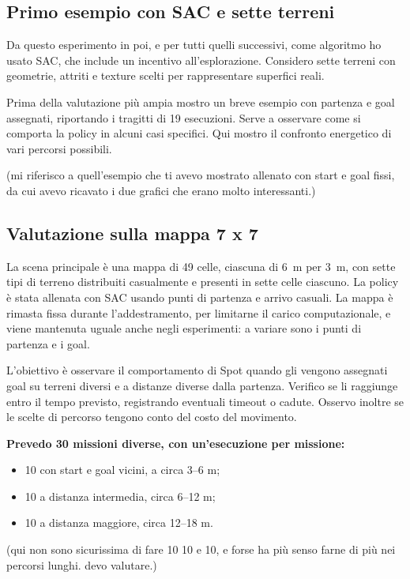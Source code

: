\documentclass[11pt,a4paper]{article}
\begin{document}
\subsection{Primo esempio con SAC e sette terreni}

Da questo esperimento in poi, e per tutti quelli successivi, come algoritmo ho usato SAC, che include un incentivo all'esplorazione.
Considero sette terreni con geometrie, attriti e texture scelti per rappresentare superfici reali.

Prima della valutazione più ampia mostro un breve esempio con partenza e goal assegnati, riportando i tragitti di 19 esecuzioni.
Serve a osservare come si comporta la policy in alcuni casi specifici.
Qui mostro il confronto energetico di vari percorsi possibili.

(mi riferisco a quell'esempio che ti avevo mostrato allenato con start e goal fissi, da cui avevo ricavato i due grafici che erano molto interessanti.)


\subsection{Valutazione sulla mappa 7 x 7}

La scena principale è una mappa di 49 celle, ciascuna di 6~m per 3~m, con sette tipi di terreno distribuiti casualmente e presenti in sette celle ciascuno.
La policy è stata allenata con SAC usando punti di partenza e arrivo casuali. La mappa è rimasta fissa durante l'addestramento, per limitarne il carico computazionale, e viene mantenuta uguale anche negli esperimenti: a variare sono i punti di partenza e i goal.

L'obiettivo è osservare il comportamento di Spot quando gli vengono assegnati goal su terreni diversi e a distanze diverse dalla partenza. Verifico se li raggiunge entro il tempo previsto, registrando eventuali timeout o cadute. Osservo inoltre se le scelte di percorso tengono conto del costo del movimento.


\textbf{Prevedo 30 missioni diverse, con un'esecuzione per missione:}
\begin{itemize}
\item 10 con start e goal vicini, a circa 3--6 m;
\item 10 a distanza intermedia, circa 6--12 m;
\item 10 a distanza maggiore, circa 12--18 m.
\end{itemize}

(qui non sono sicurissima di fare 10 10 e 10, e forse ha più senso farne di più nei percorsi lunghi. devo valutare.)
\end{document}
